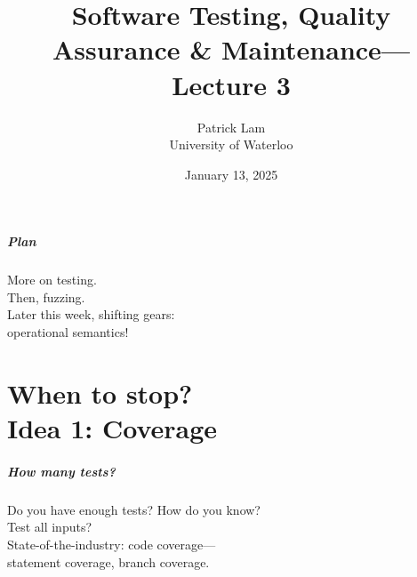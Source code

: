 \documentclass{beamer}
\title{Software Testing, Quality Assurance \& Maintenance---Lecture 3}
\author{Patrick Lam\\University of Waterloo}
\date{January 13, 2025}
\newenvironment{changemargin}[1]{%
  \begin{list}{}{%
    \setlength{\topsep}{0pt}%
    \setlength{\leftmargin}{#1}%
    \setlength{\rightmargin}{1em}
    \setlength{\listparindent}{\parindent}%
    \setlength{\itemindent}{\parindent}%
    \setlength{\parsep}{\parskip}%
  }%
  \item[]}{\end{list}}
\begin{document}
\begin{frame}
  \titlepage
\end{frame}

\begin{frame}
  \frametitle{Plan}

  \begin{changemargin}{2em}

    More on testing.\\[1em]

    Then, fuzzing.\\[2em]

    Later this week, shifting gears: \\
    \hspace*{2em} operational semantics!
  \end{changemargin}
\end{frame}

\part{When to stop? \\ Idea 1: Coverage}
\begin{frame}
  \partpage
\end{frame}

\begin{frame}
  \frametitle{How many tests?}
  \Large
  \begin{changemargin}{2em}
    Do you have enough tests? How do you know?\\[1em]

    Test all inputs?\\[1em]

    State-of-the-industry: code coverage---\\[1em]
    \hspace*{2em} statement coverage, branch coverage.
  \end{changemargin}
\end{frame}
\end{document}
